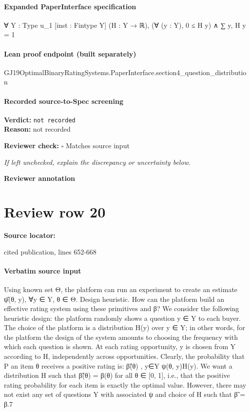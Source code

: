 \documentclass[10pt]{article}
\newcommand{\reviewerbox}{%
  \par\noindent\fbox{\parbox{0.96\linewidth}{\rule{0pt}{0.38in}}}\par
}
\newcommand{\reviewmatch}[1]{%
  \par\noindent\textbf{Reviewer check:} $\square$\; #1\par
  \noindent\emph{If left unchecked, explain the discrepancy or uncertainty below.}\par
}
\begin{document}
\paragraph{Expanded PaperInterface specification}
\begin{ReviewVerbatim}
∀ {Y : Type u_1} [inst : Fintype Y] (H : Y → ℝ), (∀ (y : Y), 0 ≤ H y) ∧ ∑ y, H y = 1
\end{ReviewVerbatim}

\paragraph{Lean proof endpoint (built separately)}\begin{ReviewVerbatim}
GJ19OptimalBinaryRatingSystems.PaperInterface.section4_question_distribution
\end{ReviewVerbatim}

\paragraph{Recorded source-to-Spec screening}
\textbf{Verdict:} \texttt{not recorded}
\\
\textbf{Reason:} not recorded
\reviewmatch{Matches source input}
\noindent\textbf{Reviewer annotation}\par
\reviewerbox
\clearpage
\hypertarget{source-claim-a5f9ed46c3edb5c1}{}
\section*{Review row 20}
\textbf{Source locator:} {\footnotesize\raggedright cited publication, lines 652-\allowbreak{}668\par}
\paragraph{Verbatim source input}
\begin{ReviewVerbatim}
Using known set Θ, the platform can run an experiment to create an estimate ψ̂(θ, y), ∀y ∈ Y, θ ∈ Θ.
Design heuristic. How can the platform build an
effective rating system using these primitives and
β? We consider the following heuristic design: the
platform randomly shows a question y ∈ Y to each
buyer. The choice of the platform is a distribution
H(y) over y ∈ Y; in other words, for the platform
the design of the system amounts to choosing the frequency with which each question is shown. At each
rating opportunity, y is chosen from Y according to
H, independently across opportunities.
Clearly, the probability that
P an item θ receives a
positive rating is: β̃(θ) , y∈Y ψ(θ, y)H(y).
We want a distribution H such that β̃(θ) = β(θ) for
all θ ∈ [0, 1], i.e., that the positive rating probability
for each item is exactly the optimal value. However,
there may not exist any set of questions Y with associated ψ and choice of H such that β̃ = β.7
\end{ReviewVerbatim}
\end{document}
